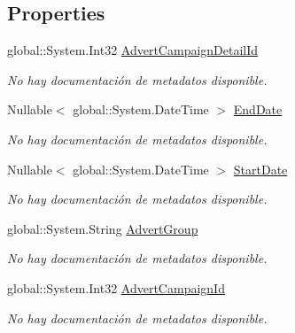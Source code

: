 \subsection*{Properties}
\begin{DoxyCompactItemize}
\item 
global\-::\-System.\-Int32 \hyperlink{class_game_memory_1_1_advert_campaign_details_a8c0831e7c4ad9024c34271fea79ce567}{Advert\-Campaign\-Detail\-Id}
\begin{DoxyCompactList}\small\item\em No hay documentación de metadatos disponible. \end{DoxyCompactList}\item 
Nullable$<$ global\-::\-System.\-Date\-Time $>$ \hyperlink{class_game_memory_1_1_advert_campaign_details_a22a86c021a8119defac4074a13bbb1e3}{End\-Date}
\begin{DoxyCompactList}\small\item\em No hay documentación de metadatos disponible. \end{DoxyCompactList}\item 
Nullable$<$ global\-::\-System.\-Date\-Time $>$ \hyperlink{class_game_memory_1_1_advert_campaign_details_a944d2e6fa9b724a2a2c6dcc83435c943}{Start\-Date}
\begin{DoxyCompactList}\small\item\em No hay documentación de metadatos disponible. \end{DoxyCompactList}\item 
global\-::\-System.\-String \hyperlink{class_game_memory_1_1_advert_campaign_details_a95b6b6def95516b545e5ba17431a1a6e}{Advert\-Group}
\begin{DoxyCompactList}\small\item\em No hay documentación de metadatos disponible. \end{DoxyCompactList}\item 
global\-::\-System.\-Int32 \hyperlink{class_game_memory_1_1_advert_campaign_details_afa3d0399d1018143dabdf96501e5df3d}{Advert\-Campaign\-Id}
\begin{DoxyCompactList}\small\item\em No hay documentación de metadatos disponible. \end{DoxyCompactList}\item 

\end{DoxyCompactItemize}
